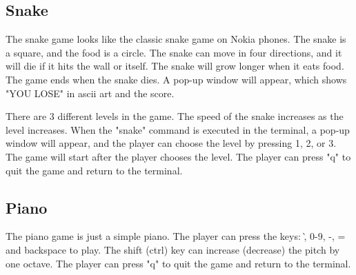 \documentclass[
	a4paper, %
	11pt, %
]{CSUniSchoolLabReport}
\begin{document}
\subsection{Snake}
The snake game looks like the classic snake game on Nokia phones. The snake is a square, and the food is a circle. The snake can move in four directions, and it will die if it hits the wall or itself. The snake will grow longer when it eats food. The game ends when the snake dies. A pop-up window will appear, which shows "YOU LOSE" in ascii art and the score.

There are 3 different levels in the game. The speed of the snake increases as the level increases. When the "snake" command is executed in the terminal, a pop-up window will appear, and the player can choose the level by pressing 1, 2, or 3. The game will start after the player chooses the level. The player can press "q" to quit the game and return to the terminal.
\subsection{Piano}
The piano game is just a simple piano. The player can press the keys: \`, 0-9, -, = and backspace to play. The shift (ctrl) key can increase (decrease) the pitch by one octave. The player can press "q" to quit the game and return to the terminal.
\end{document}
